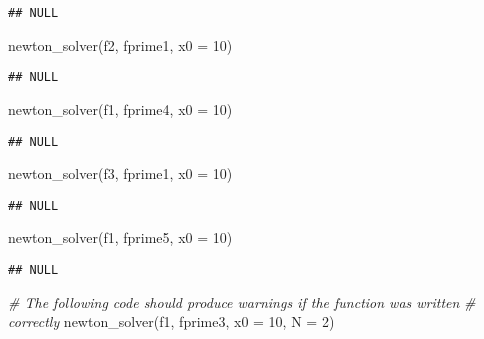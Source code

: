 \documentclass[
]{article}
\newenvironment{Shaded}{\begin{snugshade}}{\end{snugshade}}
\newcommand{\AttributeTok}[1]{\textcolor[rgb]{0.77,0.63,0.00}{#1}}
\newcommand{\CommentTok}[1]{\textcolor[rgb]{0.56,0.35,0.01}{\textit{#1}}}
\newcommand{\DecValTok}[1]{\textcolor[rgb]{0.00,0.00,0.81}{#1}}
\newcommand{\FunctionTok}[1]{\textcolor[rgb]{0.00,0.00,0.00}{#1}}
\newcommand{\NormalTok}[1]{#1}
\begin{document}
\begin{verbatim}
## NULL
\end{verbatim}

\begin{Shaded}
\begin{Highlighting}[]
\FunctionTok{newton\_solver}\NormalTok{(f2, fprime1, }\AttributeTok{x0 =} \DecValTok{10}\NormalTok{)}
\end{Highlighting}
\end{Shaded}

\begin{verbatim}
## NULL
\end{verbatim}

\begin{Shaded}
\begin{Highlighting}[]
\FunctionTok{newton\_solver}\NormalTok{(f1, fprime4, }\AttributeTok{x0 =} \DecValTok{10}\NormalTok{)}
\end{Highlighting}
\end{Shaded}

\begin{verbatim}
## NULL
\end{verbatim}

\begin{Shaded}
\begin{Highlighting}[]
\FunctionTok{newton\_solver}\NormalTok{(f3, fprime1, }\AttributeTok{x0 =} \DecValTok{10}\NormalTok{)}
\end{Highlighting}
\end{Shaded}

\begin{verbatim}
## NULL
\end{verbatim}

\begin{Shaded}
\begin{Highlighting}[]
\FunctionTok{newton\_solver}\NormalTok{(f1, fprime5, }\AttributeTok{x0 =} \DecValTok{10}\NormalTok{)}
\end{Highlighting}
\end{Shaded}

\begin{verbatim}
## NULL
\end{verbatim}

\begin{Shaded}
\begin{Highlighting}[]
\CommentTok{\# The following code should produce warnings if the function was written}
\CommentTok{\# correctly}
\FunctionTok{newton\_solver}\NormalTok{(f1, fprime3, }\AttributeTok{x0 =} \DecValTok{10}\NormalTok{, }\AttributeTok{N =} \DecValTok{2}\NormalTok{)}
\end{Highlighting}
\end{Shaded}
\end{document}
